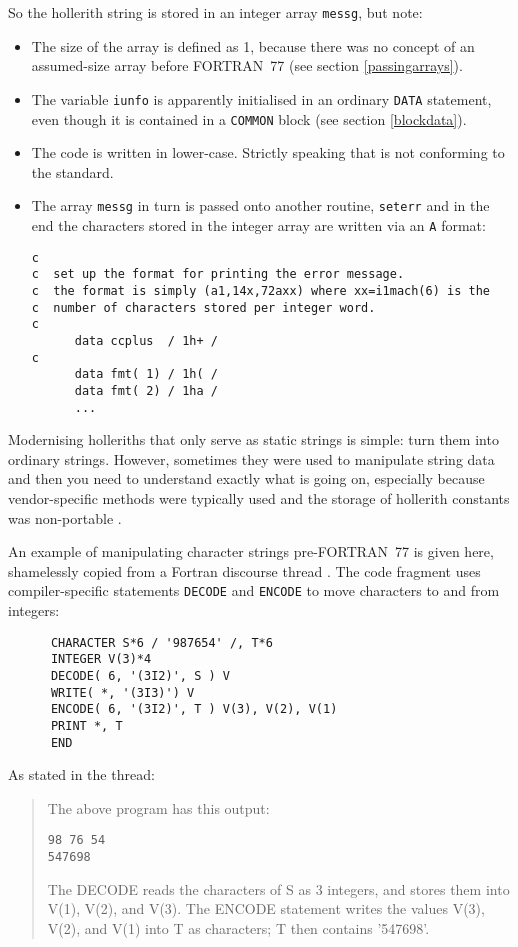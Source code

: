 So the hollerith string is stored in an integer array \verb+messg+, but note:
\begin{itemize}
\item
The size of the array is defined as 1, because there was no concept of an assumed-size array
before FORTRAN~77 (see section \ref{passingarrays}).
\item
The variable \verb+iunfo+ is apparently initialised in an ordinary \verb+DATA+ statement,
even though it is contained in a \verb+COMMON+ block (see section \ref{blockdata}).
\item
The code is written in lower-case. Strictly speaking that is not conforming to the standard.
\item
The array \verb+messg+ in turn is passed onto another routine, \verb+seterr+ and in the end
the characters stored in the integer array are written via an \verb+A+ format:
\begin{verbatim}
c
c  set up the format for printing the error message.
c  the format is simply (a1,14x,72axx) where xx=i1mach(6) is the
c  number of characters stored per integer word.
c
      data ccplus  / 1h+ /
c
      data fmt( 1) / 1h( /
      data fmt( 2) / 1ha /
      ...
\end{verbatim}
\end{itemize}

Modernising holleriths that only serve as static strings is simple: turn them into ordinary
strings. However, sometimes they were used to manipulate string data and then you need
to understand exactly what is going on, especially because vendor-specific methods were
typically used and the storage of hollerith constants was non-portable \cite{HollerithConstant}.

An example of manipulating character strings pre-FORTRAN~77 is given here, shamelessly
copied from a Fortran discourse thread \cite{BafflingCode}. The code fragment uses compiler-specific
statements \verb+DECODE+ and \verb+ENCODE+ to move characters to and from integers:
\begin{verbatim}
      CHARACTER S*6 / '987654' /, T*6
      INTEGER V(3)*4
      DECODE( 6, '(3I2)', S ) V
      WRITE( *, '(3I3)') V
      ENCODE( 6, '(3I2)', T ) V(3), V(2), V(1)
      PRINT *, T
      END
\end{verbatim}

As stated in the thread:
\begin{quote}
The above program has this output:

\begin{verbatim}
98 76 54
547698
\end{verbatim}

The DECODE reads the characters of S as 3 integers, and stores them into V(1), V(2), and V(3).
The ENCODE statement writes the values V(3), V(2), and V(1) into T as characters; T then contains '547698'.
\end{quote}

